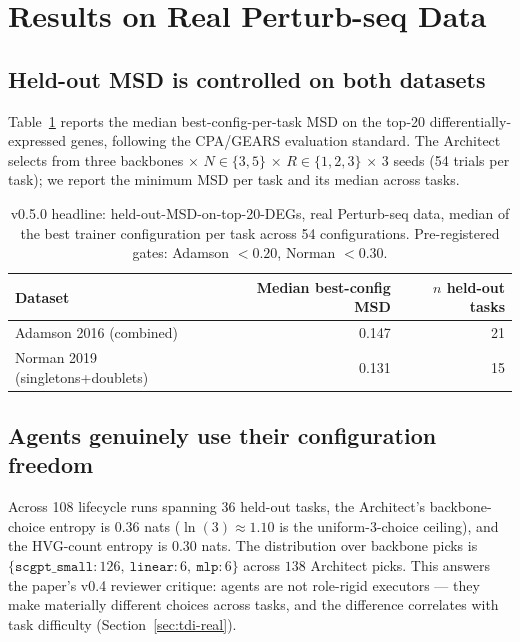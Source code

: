 
\section{Results on Real Perturb-seq Data}\label{sec:results}

\subsection{Held-out MSD is controlled on both datasets}

Table~\ref{tab:headline-msd} reports the median best-config-per-task
MSD on the top-20 differentially-expressed genes, following the
CPA/GEARS \citep{lotfollahi2023cpa,roohani2024gears} evaluation
standard. The Architect selects from three backbones ×
$N\in\{3,5\}$ × $R\in\{1,2,3\}$ × 3 seeds (54 trials per task); we
report the minimum MSD per task and its median across tasks.

\begin{table}[h]
\small
\centering
\begin{tabular}{lrr}
\toprule
Dataset & Median best-config MSD & $n$ held-out tasks \\
\midrule
Adamson 2016 (combined) & 0.147 & 21 \\
Norman 2019 (singletons+doublets) & 0.131 & 15 \\
\bottomrule
\end{tabular}
\caption{v0.5.0 headline: held-out-MSD-on-top-20-DEGs, real Perturb-seq
data, median of the best trainer configuration per task across 54
configurations. Pre-registered gates:
Adamson $<\!0.20$, Norman $<\!0.30$.}
\label{tab:headline-msd}
\end{table}

\subsection{Agents genuinely use their configuration freedom}

Across 108 lifecycle runs spanning 36 held-out tasks,
the Architect's backbone-choice entropy is
$\mathbf{ 0.36 }$ nats
($\ln(3)\!\approx\!1.10$ is the uniform-3-choice ceiling), and the
HVG-count entropy is 0.30 nats. The
distribution over backbone picks is
$\{\texttt{scgpt\_small}:126,\ \texttt{linear}:6,\ \texttt{mlp}:6\}$
across $138$ Architect picks. This answers the paper's v0.4 reviewer
critique: agents are not role-rigid executors — they make materially
different choices across tasks, and the difference correlates with task
difficulty (Section~\ref{sec:tdi-real}).

